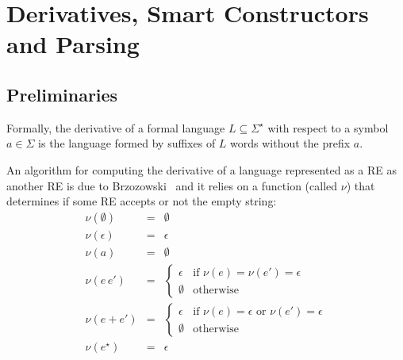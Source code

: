 \documentclass{llncs}
\begin{document}
\section{Derivatives, Smart Constructors and Parsing}\label{sec:deriv}

\subsection{Preliminaries}

Formally, the derivative of a formal language $L\subseteq
\Sigma^\star$ with respect to a symbol $a\in\Sigma$ is the language
formed by suffixes of $L$ words without the prefix $a$.

An algorithm for computing the derivative of a language represented as
a RE as another RE is due to Brzozowski~\cite{Brzozowski1964} and it
relies on a function (called $\nu$) that determines if some RE accepts
or not the empty string:
\[
    \begin{array}{lcl}
         \nu(\emptyset) & = & \emptyset \\
         \nu(\epsilon)    & = & \epsilon \\
         \nu(a)                & = & \emptyset \\
         \nu(e\,e')           & = & \left\{
                                                 \begin{array}{ll}
                                                      \epsilon &
                                                                 \text{if
                                                                 }\nu(e)
                                                                 =
                                                                 \nu(e')
                                                                 =
                                                                 \epsilon
                                                   \\
                                                   \emptyset &
                                                               \text{otherwise}
                                                 \end{array}
                                             \right. \\
         \nu(e + e')  & = & \left\{
                                         \begin{array}{ll}
                                              \epsilon & \text{if
                                                         }\nu(e) =
                                                         \epsilon
                                                         \text{ or
                                                         }\nu(e') =
                                                         \epsilon \\
                                              \emptyset & \text{otherwise}
                                         \end{array}
                                      \right. \\
         \nu(e^\star) & = & \epsilon
    \end{array}
\]
\end{document}
